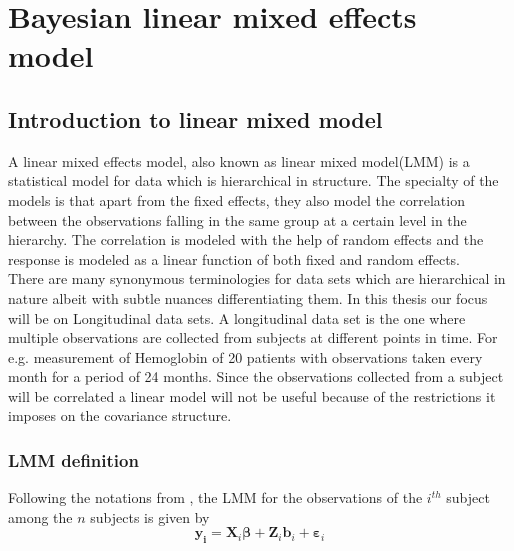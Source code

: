 
\chapter{Bayesian linear mixed effects model}
\label{ch : blmm}

\section{Introduction to linear mixed model}
\label{sec : lmm}
A linear mixed effects model, also known as linear mixed model(LMM) is a statistical model for data which is hierarchical in structure. The specialty of the models is that apart from the fixed effects, they also model the correlation between the observations falling in the same group at a certain level in the hierarchy. The correlation is modeled with the help of random effects and the response is modeled as a linear function of both fixed and random effects.\\

There are many synonymous terminologies for data sets which are hierarchical in nature albeit with subtle nuances differentiating them. In this thesis our focus will be on Longitudinal data sets. A longitudinal data set is the one where multiple observations are collected from subjects at different points in time. For e.g. measurement of Hemoglobin of 20 patients with observations taken every month for a period of 24 months. Since the observations collected from a subject will be correlated a linear model will not be useful because of the restrictions it imposes on the covariance structure.\\


\subsection{LMM definition}
\label{subsec : lmm_definition}
Following the notations from \citet{lesaffre_bayesian_2012}, the LMM for the observations of the $i^{th}$ subject among the $n$ subjects is given by\\

$$\boldsymbol{y_i} = \boldsymbol{X}_{i}\boldsymbol{\beta} + \boldsymbol{Z}_{i}\boldsymbol{b}_{i} + \boldsymbol{\varepsilon}_{i}$$\\

